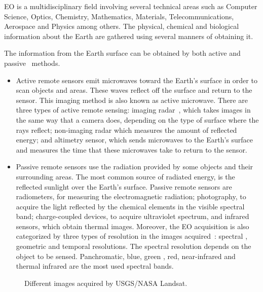 \ac{EO} is a multidisciplinary field involving several technical areas such as
Computer Science, Optics,
Chemistry, Mathematics, Materials, Telecommunications, Aerospace and Physics among others. The physical, chemical and biological
information about the Earth are gathered using several manners of obtaining it.

The information from the Earth surface can be obtained by both active  and
passive~\cite{NASA} methods.
\begin{itemize}
\item Active remote sensors emit microwaves toward the Earth's
surface in order to scan objects and areas. These waves reflect off the surface and return to the sensor. This imaging
method is also known as active microwave. There are three types of active remote
sensing: imaging radar~\cite{NSIDC}, which takes images in the same way that a
camera does, depending on the type of
surface where the rays reflect; non-imaging radar which measures the amount of reflected energy; and altimetry
sensor, which sends microwaves to the Earth's surface and measures the time that these
microwaves take to return to the sensor.\\
\item Passive remote sensors use the radiation provided by some objects and
  their surrounding areas. The most common source of radiated energy, is the reflected
sunlight over the Earth's surface. Passive remote sensors are radiometers, for
measuring the electromagnetic radiation; photography, to acquire the light
reflected by the chemical elements in the visible spectral band; charge-coupled
devices, to acquire ultraviolet spectrum, and infrared sensors, which obtain thermal
images. Moreover, the \ac{EO} acquisition is also categorized by three types of
resolution in the images acquired~\cite{Sandau2009}: spectral , geometric and temporal
resolutions. The spectral resolution depends on the object to be
sensed. Panchromatic, blue, green , red, near-infrared and thermal infrared are the
most used spectral bands.
\end{itemize}


\begin{figure*}
\begin{center}
 \hspace{0.05\textwidth}
\caption{Different images acquired by \acs{USGS}/\acs{NASA} Landsat.}
\end{center}
\end{figure*}

